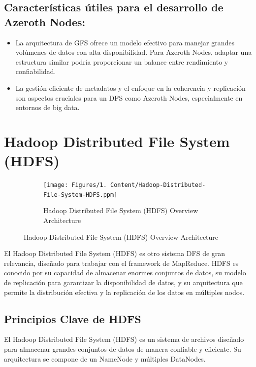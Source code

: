 \subsection{Características útiles para el desarrollo de Azeroth Nodes:}

\begin{itemize}
    \item La arquitectura de GFS ofrece un modelo efectivo para manejar grandes volúmenes de datos con alta disponibilidad. Para Azeroth Nodes, adaptar una estructura similar podría proporcionar un balance entre rendimiento y confiabilidad.
    \item La gestión eficiente de metadatos y el enfoque en la coherencia y replicación son aspectos cruciales para un DFS como Azeroth Nodes, especialmente en entornos de big data.
\end{itemize}

\section{Hadoop Distributed File System (HDFS)}

\begin{figure}[H]
    \centering
    \begin{subfigure}[b]{0.5\textwidth}
        \centering
        \texttt{[image: Figures/1. Content/Hadoop-Distributed-File-System-HDFS.ppm]}
        \caption{Hadoop Distributed File System (HDFS) Overview Architecture}
        \label{fig: HDFSArchitecture}
    \end{subfigure}
    \hfill
\end{figure}

El Hadoop Distributed File System (HDFS) es otro sistema DFS de gran relevancia, diseñado para trabajar con el framework de MapReduce. HDFS es conocido por su capacidad de almacenar enormes conjuntos de datos, su modelo de replicación para garantizar la disponibilidad de datos, y su arquitectura que permite la distribución efectiva y la replicación de los datos en múltiples nodos.

\subsection{Principios Clave de HDFS}

El Hadoop Distributed File System (HDFS) es un sistema de archivos diseñado para almacenar grandes conjuntos de datos de manera confiable y eficiente. Su arquitectura se compone de un NameNode y múltiples DataNodes.

